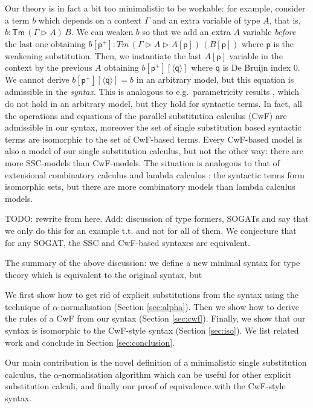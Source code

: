 \documentclass[sigplan,10pt,anonymous,review]{acmart}\settopmatter{printfolios=true,printccs=false,printacmref=false}
\newcommand{\Tm}{\mathsf{Tm}}
\newcommand{\p}{\mathsf{p}}
\newcommand{\q}{\mathsf{q}}
\newcommand{\ext}{\mathop{\triangleright}}
\begin{document}
Our theory is in fact a bit too minimalistic to be workable: for
example, consider a term $b$ which depends on a context $\Gamma$ and
an extra variable of type $A$, that is, $b : \Tm\,(\Gamma\ext
A)\,B$. We can weaken $b$ so that we add an extra $A$ variable
\emph{before} the last one obtaining $b[\p^+] : Tm\,(\Gamma\ext A\ext
A[\p])\,(B[\p])$ where $\p$ is the weakening substitution. Then, we
instantiate the last $A[\p]$ variable in the context by the previous
$A$ obtaining $b[\p^+][\langle\q\rangle]$ where $\q$ is De Bruijn
index $0$. We cannot derive $b[\p^+][\langle\q\rangle] = b$ in an
arbitrary model, but this equation is admissible in the \emph{syntax}.
This is analogous to e.g.\ parametricity results
\cite{DBLP:journals/jfp/BernardyJP12}, which do not hold in an
arbitrary model, but they hold for syntactic terms. In fact, all the
operations and equations of the parallel substitution calculus (CwF)
are admissible in our syntax, moreover the set of single substitution
based syntactic terms are isomorphic to the set of CwF-based
terms. Every CwF-based model is also a model of our single
substitution calculus, but not the other way: there are more
SSC-models than CwF-models. The situation is analogous to that of
extensional combinatory calculus and lambda calculus
\cite{DBLP:conf/fscd/AltenkirchKSV23}: the syntactic terms form
isomorphic sets, but there are more combinatory models than lambda
calculus models.

TODO: rewrite from here. Add: discussion of type formers, SOGATs and say that we only do this
for an example t.t. and not for all of them. We conjecture that for
any SOGAT, the SSC and CwF-based syntaxes are equivalent.

The summary of the above discussion: we define a new minimal syntax
for type theory which is equivalent to the original syntax, but

We first show how to get rid of explicit substitutions from the syntax
using the technique of $\alpha$-normalisation (Section
\ref{sec:alpha}). Then we show how to derive the rules of a CwF from
our syntax (Section \ref{sec:cwf}). Finally, we show that our syntax
is isomorphic to the CwF-style syntax (Section \ref{sec:iso}). We list
related work and conclude in Section \ref{sec:conclusion}.

Our main contribution is the novel definition of a minimalistic single
substitution calculus, the $\alpha$-normalisation algorithm which can
be useful for other explicit substitution calculi, and finally our
proof of equivalence with the CwF-style syntax.
\end{document}
